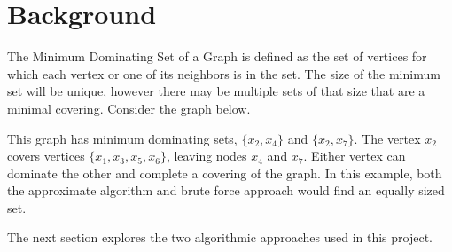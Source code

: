 \documentclass[paper.tex]{subfiles}
\begin{document}
\section{Background}

The Minimum Dominating Set of a Graph is defined as the set of vertices for which each vertex or one of its neighbors is in the set.
The size of the minimum set will be unique, however there may be multiple sets of that size that are a minimal covering.
Consider the graph below.

\begin{center}
\end{center}

This graph has minimum dominating sets, $\{x_2,x_4\}$ and $\{x_2,x_7\}$.
The vertex $x_2$ covers vertices $\{x_1,x_3,x_5,x_6\}$, leaving nodes $x_4$ and $x_7$.
Either vertex can dominate the other and complete a covering of the graph.
In this example, both the approximate algorithm and brute force approach would find an equally sized set.

The next section explores the two algorithmic approaches used in this project.
\end{document}
